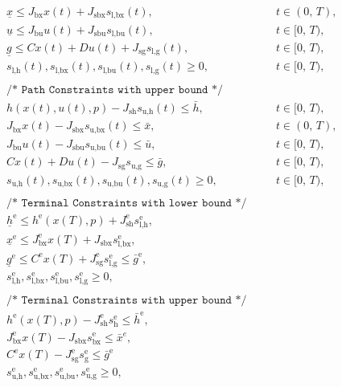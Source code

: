 \documentclass{article}
\newcommand{\ind}[1]{_{\textrm{#1}}}
\newcommand{\terminal}{^{\textrm{e}}}
\newcommand{\lowerh}{\ind{l,h}}
\newcommand{\lowerbx}{\ind{l,bx}}
\newcommand{\lowerbu}{\ind{l,bu}}
\newcommand{\lowerg}{\ind{l,g}}
\newcommand{\upperh}{\ind{u,h}}
\newcommand{\upperbx}{\ind{u,bx}}
\newcommand{\upperbu}{\ind{u,bu}}
\newcommand{\upperg}{\ind{u,g}}
\newcommand{\mathComment}[1]{\texttt{/* #1 */}}
\begin{document}
\begin{align*}
	&&&\underline{x} \leq J_{\textrm{bx}} x(t) + J_{\textrm{sbx}} s\lowerbx(t), &&\quad t \in (0,\,T),\\
	&&&\underline{u} \leq J_{\textrm{bu}} u(t) + J_{\textrm{sbu}} s\lowerbu(t), &&\quad t \in [0,\,T),\\
	&&&\underline{g} \leq Cx(t) + Du(t) + J_{\textrm{sg}} s\lowerg(t), &&\quad t \in [0,\,T), \\
	&&& s\lowerh (t), s\lowerbx(t), s\lowerbu(t), s\lowerg(t) \geq 0, &&\quad t \in [0,\,T), \\
	&&& && \\[-1em]
	&&&\mathComment{Path Constraints with upper bound}\\
	&&& h(x(t), u(t), p) - J_{\textrm{sh}} s\upperh(t) \leq \bar{h}, &&\quad t \in [0,\,T),\\
	&&& J_{\textrm{bx}} x(t) - J_{\textrm{sbx}} s\upperbx(t) \leq \bar{x}, &&\quad t \in (0,\,T),\\
	&&& J_{\textrm{bu}} u(t) - J_{\textrm{sbu}} s\upperbu(t)\leq \bar{u}, &&\quad t \in [0,\,T),\\
	&&&Cx(t) + Du(t) - J_{\textrm{sg}} s\upperg \leq \bar{g}, &&\quad t \in [0,\,T), \\
	&&& s\upperh(t), s\upperbx(t), s\upperbu(t), s\upperg(t) \geq 0, &&\quad t \in [0,\,T), \\
	&&& && \\[-1em]
	&&&\mathComment{Terminal Constraints with lower bound}\\
	&&&\underline{h}\terminal \leq h\terminal(x(T), p) + J\ind{sh}\terminal s\lowerh\terminal, &&\\
	&&&\underline{x}\terminal \leq J_{\textrm{bx}}\terminal x(T) + J\ind{sbx} s\lowerbx\terminal, &&\\ %
	&&&\underline{g}\terminal \leq C\terminal x(T) + J\ind{sg}\terminal s\lowerg\terminal \leq \bar{g}\terminal, && \\
	&&& s\lowerh\terminal, s\lowerbx\terminal, s\lowerbu\terminal, s\lowerg\terminal \geq 0, \\
	&&& && \\[-1em]
	&&&\mathComment{Terminal Constraints with upper bound}\\
	&&& h\terminal(x(T), p) - J\ind{sh}\terminal s\ind{h}\terminal \leq \bar{h}\terminal, &&\\
	&&& J_{\textrm{bx}}\terminal x(T) - J\ind{sbx} s\ind{bx}\terminal \leq \bar{x}^{e}, &&\\ %
	&&& C\terminal x(T) - J\ind{sg}\terminal s\ind{g}\terminal \leq \bar{g}\terminal \\
	&&& s\upperh\terminal, s\upperbx\terminal, s\upperbu\terminal, s\upperg\terminal \geq 0,
\end{align*}
\end{document}
